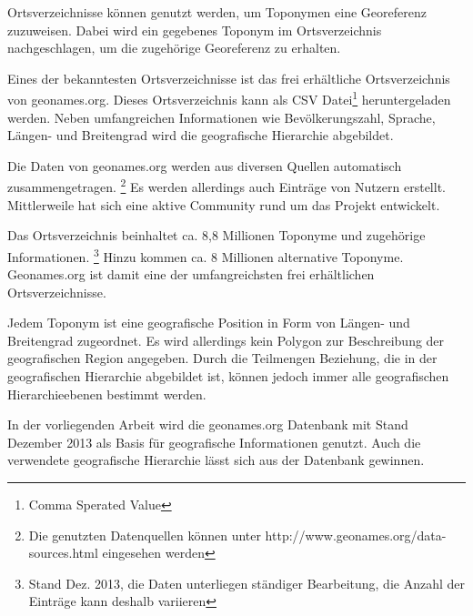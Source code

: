 			Ortsverzeichnisse können genutzt werden, um Toponymen eine Georeferenz zuzuweisen. 
			Dabei wird ein gegebenes Toponym im Ortsverzeichnis nachgeschlagen, um die zugehörige Georeferenz zu erhalten.  
		
			Eines der bekanntesten Ortsverzeichnisse ist das frei erhältliche Ortsverzeichnis von geonames.org. 
			Dieses Ortsverzeichnis kann als CSV Datei\footnote{Comma Sperated Value} heruntergeladen werden.
			Neben umfangreichen Informationen wie Bevölkerungszahl, Sprache, Längen- und Breitengrad wird die geografische Hierarchie abgebildet.

			Die Daten von geonames.org werden aus diversen Quellen automatisch zusammengetragen. \footnote{Die genutzten Datenquellen können unter http://www.geonames.org/data-sources.html eingesehen werden} 
			Es werden allerdings auch Einträge von Nutzern erstellt. 
			Mittlerweile hat sich eine aktive Community rund um das Projekt entwickelt. 

			Das Ortsverzeichnis beinhaltet ca. 8,8 Millionen Toponyme und zugehörige Informationen. \footnote{Stand Dez. 2013, die Daten unterliegen ständiger Bearbeitung, die Anzahl der Einträge kann deshalb variieren} 
			Hinzu kommen ca. 8 Millionen alternative Toponyme.
			Geonames.org ist damit eine der umfangreichsten frei erhältlichen Ortsverzeichnisse.

			Jedem Toponym ist eine geografische Position in Form von Längen- und Breitengrad zugeordnet. 
			Es wird allerdings kein Polygon zur Beschreibung der geografischen Region angegeben.
			Durch die Teilmengen Beziehung, die in der geografischen Hierarchie abgebildet ist, können jedoch immer alle geografischen Hierarchieebenen bestimmt werden.

			In der vorliegenden Arbeit wird die geonames.org Datenbank mit Stand Dezember 2013 als Basis für geografische Informationen genutzt.
			Auch die verwendete geografische Hierarchie lässt sich aus der Datenbank gewinnen.

		

	

	
